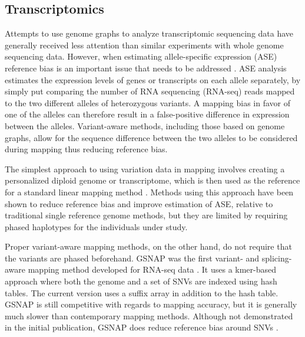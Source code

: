 
\subsection{Transcriptomics}

Attempts to use genome graphs to analyze transcriptomic sequencing data have generally received less attention than similar experiments with whole genome sequencing data.
However, when estimating allele-specific expression (ASE) reference bias is an important issue that needs to be addressed \cite{Degner2009-vw,Castel2015-ef}.
ASE analysis estimates the expression levels of genes or transcripts on each allele separately, by simply put comparing the number of RNA sequencing (RNA-seq) reads mapped to the two different alleles of heterozygous variants.
A mapping bias in favor of one of the alleles can therefore result in a false-positive difference in expression between the alleles.
Variant-aware methods, including those based on genome graphs, allow for the sequence difference between the two alleles to be considered during mapping thus reducing reference bias.

The simplest approach to using variation data in mapping involves creating a personalized diploid genome or transcriptome, which is then used as the reference for a standard linear mapping method \cite{Turro2011-op,Rozowsky_2011,Bray_2016,Raghupathy2018-sd}.
Methods using this approach have been shown to reduce reference bias and improve estimation of ASE, relative to traditional single reference genome methods, but they are limited by requiring phased haplotypes for the individuals under study.

Proper variant-aware mapping methods, on the other hand, do not require that the variants are phased beforehand.
GSNAP was the first variant- and splicing-aware mapping method developed for RNA-seq data \cite{Wu2010-hv}.
It uses a kmer-based approach where both the genome and a set of SNVs are indexed using hash tables.
The current version uses a suffix array in addition to the hash table.
GSNAP is still competitive with regards to mapping accuracy, but it is generally much slower than contemporary mapping methods.
Although not demonstrated in the initial publication, GSNAP does reduce reference bias around SNVs \cite{Castel2015-ef}.

